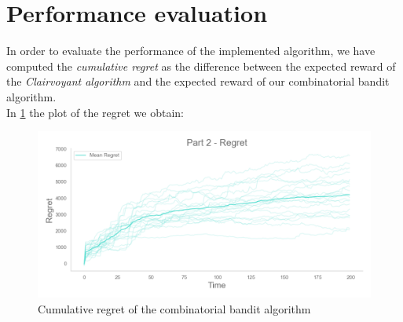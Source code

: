\section{Performance evaluation}
In order to evaluate the performance of the implemented algorithm, we have computed the \emph{cumulative regret} as the difference between the expected reward of the \textit{Clairvoyant algorithm} and the expected reward of our combinatorial bandit algorithm.\\
In \ref{regret2Fig} the plot of the regret we obtain:
\begin{figure}[!htb]
    \centering
    \includegraphics[width=\textwidth]{images/Part2_regret.png}
    \caption{Cumulative regret of the combinatorial bandit algorithm}
    \label{regret2Fig}
\end{figure}


